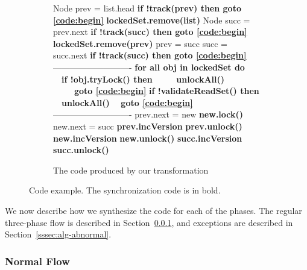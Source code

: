 \begin{figure*}
\begin{center}
\begin{subfigure}[b]{.45\textwidth}
\begin{algorithmic}[1]{}
{			\State{\spOne}Node prev = list.head
			\State{\spOne}\textbf{if !track(prev)  then {goto} \ref{code:begin}} \label{code:readGhaseGoto1}
            \State{\spOne}\textbf{lockedSet.remove(list)} \label{code:lockedSet:remove1}
			\State{\spOne}Node succ = prev.next
			\State{\spOne}\textbf{if !track(succ) then {goto} \ref{code:begin}}  \label{code:readGhaseGoto2}
			\State{\spOne}\textbf{lockedSet.remove(prev)} \label{code:lockedSet:remove2}
			\State{\spZero}prev = succ
			\State{\spZero}succ = succ.next
			\State{\spZero}\textbf{if !track(succ) then {goto} \ref{code:begin}} \label{code:readGhaseGoto3}
			\Statex ----------------------------
			\State{\spZero}\textbf{for all obj in lockedSet do} \label{code:validateLockedSet}	
            \State{\spZero}\ \ \textbf{if !obj.tryLock() then}
            \State{\spZero}\ \ \ \ \ \textbf{unlockAll()}
            \State{\spZero}\ \ \ \ \ \textbf{{goto} \ref{code:begin}} \label{code:validateGoto1}
			\State{\spZero}\textbf{if !validateReadSet() then} 		\label{code:validateReadSet}
				\State{\spZero}\ \ \textbf{unlockAll()}
				\State{\spZero}\ \ \textbf{{goto} \ref{code:begin}} \label{code:validateGoto2}
			\Statex ----------------------------
			\State{\spZero}prev.next = new
			\State{\spZero}\textbf{new.lock()}
			\State{\spZero}new.next = succ			
			\State{\spZero}\textbf{prev.incVersion}
			\State{\spZero}\textbf{prev.unlock()}
			\State{\spZero}\textbf{new.incVersion}
			\State{\spZero}\textbf{new.unlock()}
			\State{\spZero}\textbf{succ.incVersion}
			\State{\spZero}\textbf{succ.unlock()}

			\EndFunction
			}
		\end{algorithmic}
		\caption{The code produced by our  transformation}\label{figure:transformation:after}
	\end{subfigure}
	\end{center}
\vspace{-4mm}
	\caption{Code example.
	The synchronization code is in bold.
			\label{figure:transformation}}
\end{figure*}

We now describe how we synthesize the code for each of the phases. The regular three-phase flow is described in
Section~\ref{sssec:alg-normal}, and exceptions are described in Section~\ref{sssec:alg-abnormal}.

\subsubsection{Normal Flow}
\label{sssec:alg-normal}


